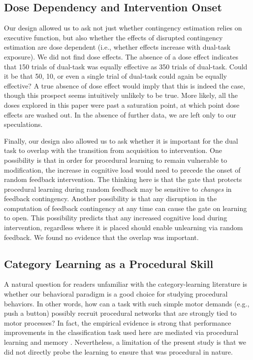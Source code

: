 \documentclass[apacite,draftfirst,man]{apa6}
\begin{document}
\subsection*{Dose Dependency and Intervention Onset}
Our design allowed us to ask not just whether contingency estimation relies on
executive function, but also whether the effects of disrupted contingency
estimation are dose dependent (i.e., whether effects increase with dual-task
exposure). We did not find dose effects. The absence of a dose effect indicates
that 150 trials of dual-task was equally effective as 350 trials of dual-task.
Could it be that 50, 10, or even a single trial of dual-task could again be
equally effective? A true absence of dose effect would imply that this is indeed
the case, though this prospect seems intuitively unlikely to be true. More
likely, all the doses explored in this paper were past a saturation point, at
which point dose effects are washed out. In the absence of further data, we are
left only to our speculations.

Finally, our design also allowed us to ask whether it is important for the dual
task to overlap with the transition from acquisition to intervention. One
possibility is that in order for procedural learning to remain vulnerable to
modification, the increase in cognitive load would need to precede the onset of
random feedback intervention. The thinking here is that the gate that protects
procedural learning during random feedback may be sensitive to \textit{changes}
in feedback contingency. Another possibility is that any disruption in the
computation of feedback contingency at any time can cause the gate on learning
to open. This possibility predicts that any increased cognitive load during
intervention, regardless where it is placed should enable unlearning via random
feedback.  We found no evidence that the overlap was important.

\subsection*{Category Learning as a Procedural Skill}
A natural question for readers unfamiliar with the category-learning literature
is whether our behavioral paradigm is a good choice for studying procedural
behaviors. In other words, how can a task with such simple motor demands (e.g.,
push a button) possibly recruit procedural networks that are strongly tied to
motor processes? In fact, the empirical evidence is strong that performance
improvements in the classification task used here are mediated via procedural
learning and memory \cite{AshbyMaddox2005, AshbyMaddox2010, AshbyValentin2016a}.
Nevertheless, a limitation of the present study is that we did not directly
probe the learning to ensure that was procedural in nature. 
\end{document}
